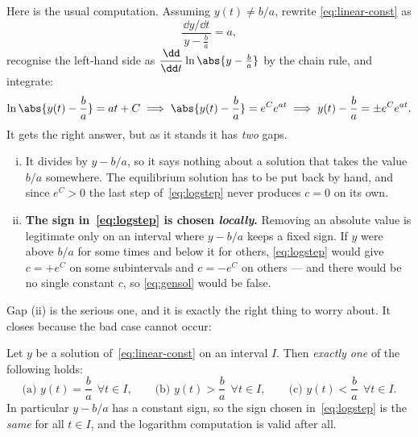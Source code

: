 \begin{remark}\label{rmk:logcare}
	Here is the usual computation. Assuming \(y(t) \neq b/a\), rewrite
	\eqref{eq:linear-const} as
	\[
		\frac{\dd y/\dd t}{\,y - \frac{b}{a}\,} = a,
	\]
	recognise the left-hand side as
	\(\dfrac{\dd}{\dd t} \ln\abs{y - \frac{b}{a}}\) by the chain rule, and integrate:
	\begin{equation}\label{eq:logstep}
		\ln\abs{y(t) - \frac{b}{a}} = at + C
		\implies
		\abs{y(t) - \frac{b}{a}} = e^{C} e^{at}
		\implies
		y(t) - \frac{b}{a} = \pm e^{C} e^{at}.
	\end{equation}
	It gets the right answer, but as it stands it has \emph{two} gaps.
	\begin{enumerate}[(i)]
		\item It divides by \(y - b/a\), so it says nothing about a solution that takes the
		      value \(b/a\) somewhere. The equilibrium solution has to be put back by hand,
		      and since \(e^{C} > 0\) the last step of~\eqref{eq:logstep} never produces
		      \(c = 0\) on its own.
		\item \textbf{The sign in~\eqref{eq:logstep} is chosen \emph{locally}.} Removing an
		      absolute value is legitimate only on an interval where \(y - b/a\) keeps a
		      fixed sign. If \(y\) were above \(b/a\) for some times and below it for others,
		      \eqref{eq:logstep} would give \(c = +e^{C}\) on some subintervals and
		      \(c = -e^{C}\) on others --- and there would be no single constant \(c\), so
		      \eqref{eq:gensol} would be false.
	\end{enumerate}
	Gap (ii) is the serious one, and it is exactly the right thing to worry about. It
	closes because the bad case cannot occur:
\end{remark}

\begin{corollary}\label{cor:nocross}
	Let \(y\) be a solution of~\eqref{eq:linear-const} on an interval \(I\). Then
	\emph{exactly one} of the following holds:
	\[
		\text{(a) } y(t) = \frac{b}{a} \ \ \forall t \in I,
		\qquad
		\text{(b) } y(t) > \frac{b}{a} \ \ \forall t \in I,
		\qquad
		\text{(c) } y(t) < \frac{b}{a} \ \ \forall t \in I.
	\]
	In particular \(y - b/a\) has a constant sign, so the sign chosen
	in~\eqref{eq:logstep} is the \emph{same} for all \(t \in I\), and the logarithm
	computation is valid after all.
\end{corollary}

